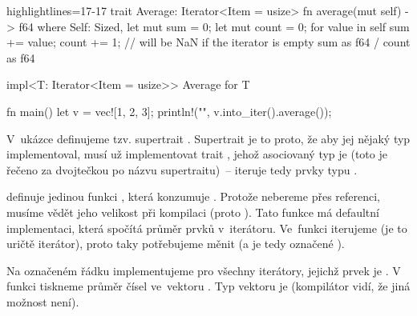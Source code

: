 \documentclass[main.tex]{subfiles}
\begin{document}
\obrazek
\begin{rustcode*}{highlightlines={17-17}}
    trait Average: Iterator<Item = usize> {
        fn average(mut self) -> f64
        where
            Self: Sized,
        {
            let mut sum = 0;
            let mut count = 0;
            for value in self {
                sum += value;
                count += 1;
            }
            // will be NaN if the iterator is empty
            sum as f64 / count as f64
        }
    }

    impl<T: Iterator<Item = usize>> Average for T {}

    fn main() {
        let v = vec![1, 2, 3];
        println!("{}", v.into_iter().average());
    }
\end{rustcode*}

V~ukázce definujeme tzv. supertrait . Supertrait je to proto, že aby jej
nějaký typ implementoval, musí už implementovat trait , jehož asociovaný
typ  je  (toto je řečeno za dvojtečkou po názvu supertraitu)~--
iteruje tedy prvky typu .

 definuje jedinou funkci , která konzumuje .
Protože nebereme  přes referenci, musíme vědět jeho velikost při kompilaci
(proto ). Tato funkce má defaultní implementaci, která spočítá průměr prvků
v~iterátoru. Ve~funkci iterujeme  (je to uričtě iterátor), proto taky
potřebujeme  měnit (a je tedy označené ).

Na označeném řádku implementujeme  pro všechny iterátory, jejichž prvek je
. V~ funkci tiskneme průměr čísel ve~vektoru . Typ
vektoru  je  (kompilátor vidí, že jiná možnost není).
\end{document}
